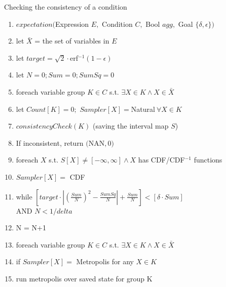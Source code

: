 \vspace*{0.05in}
\begin{algorithm} Checking the consistency of a condition
\footnotesize
\begin{enumerate}
\item $expectation($Expression $E,$ Condition $C,$ Bool $agg,$ Goal $\{\delta, \epsilon\})$
\item \hspace*{0.1in} let $\bar X$ = the set of variables in $E$
\item \hspace*{0.1in} let $target = \sqrt{2}\cdot $erf$^{-1}(1-\epsilon)$
\item \hspace*{0.1in} let $N = 0; Sum = 0; SumSq = 0$
\item \hspace*{0.1in} foreach variable group $K \in C$ s.t. $\exists X \in K \wedge X \in \bar X$ 
\item \hspace*{0.2in} let $Count[K] = 0;$ $Sampler[X] = $Natural$\ \forall X \in K$
\item \hspace*{0.2in} $consistencyCheck(K)$ (saving the interval map $S$)
\item \hspace*{0.2in} If inconsistent, return $($NAN$,0)$
\item \hspace*{0.2in} foreach $X$ s.t. $S[X] \neq [-\infty, \infty] \wedge X$ has CDF/CDF$^{-1}$ functions
\item \hspace*{0.3in} $Sampler[X] =$ CDF
\item \hspace*{0.1in} while $\left[target \cdot \left|(\frac{Sum}{N})^2 - \frac{SumSq}{N}\right| + \frac{Sum}{N}\right] < \left[\delta \cdot Sum\right]$  \\\hspace*{0.4in} AND $N < 1/delta$
\item \hspace*{0.2in} N = N+1
\item \hspace*{0.2in} foreach variable group $K \in C$ s.t. $\exists X \in K \wedge X \in \bar X$
\item \hspace*{0.3in} if $Sampler[X] =$ Metropolis for any $X \in K$
\item \hspace*{0.4in} run metropolis over saved state for group K

\end{enumerate}
\end{algorithm}
